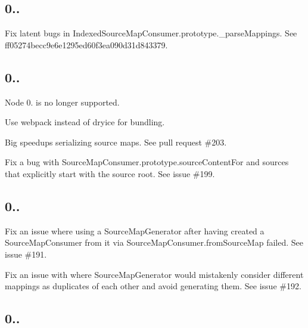 \subsection*{0..}


\begin{DoxyItemize}
\item Fix latent bugs in Indexed\+Source\+Map\+Consumer.\+prototype.\+\_\+parse\+Mappings. See ff05274becc9e6e1295ed60f3ea090d31d843379.
\end{DoxyItemize}

\subsection*{0..}


\begin{DoxyItemize}
\item Node 0. is no longer supported.
\item Use webpack instead of dryice for bundling.
\item Big speedups serializing source maps. See pull request \#203.
\item Fix a bug with {\ttfamily Source\+Map\+Consumer.\+prototype.\+source\+Content\+For} and sources that explicitly start with the source root. See issue \#199.
\end{DoxyItemize}

\subsection*{0..}


\begin{DoxyItemize}
\item Fix an issue where using a {\ttfamily Source\+Map\+Generator} after having created a {\ttfamily Source\+Map\+Consumer} from it via {\ttfamily Source\+Map\+Consumer.\+from\+Source\+Map} failed. See issue \#191.
\item Fix an issue with where {\ttfamily Source\+Map\+Generator} would mistakenly consider different mappings as duplicates of each other and avoid generating them. See issue \#192.
\end{DoxyItemize}

\subsection*{0..}


